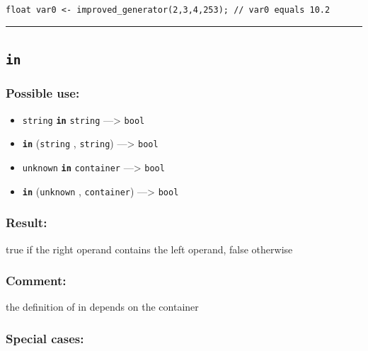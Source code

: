 \documentclass[]{book}
\providecommand{\tightlist}{%
  \setlength{\itemsep}{0pt}\setlength{\parskip}{0pt}}
\theoremstyle{definition}
\theoremstyle{definition}
\theoremstyle{definition}
\theoremstyle{remark}
\begin{document}
\begin{verbatim}
 
float var0 <- improved_generator(2,3,4,253); // var0 equals 10.2
\end{verbatim}

\begin{center}\rule{0.5\linewidth}{\linethickness}\end{center}

\subsection{\texorpdfstring{\texttt{in}}{in}}\label{in}

\subsubsection{Possible use:}\label{possible-use-266}

\begin{itemize}
\tightlist
\item
  \texttt{string} \textbf{\texttt{in}} \texttt{string} ---\textgreater{}
  \texttt{bool}
\item
  \textbf{\texttt{in}} (\texttt{string} , \texttt{string})
  ---\textgreater{} \texttt{bool}
\item
  \texttt{unknown} \textbf{\texttt{in}} \texttt{container}
  ---\textgreater{} \texttt{bool}
\item
  \textbf{\texttt{in}} (\texttt{unknown} , \texttt{container})
  ---\textgreater{} \texttt{bool}
\end{itemize}

\subsubsection{Result:}\label{result-256}

true if the right operand contains the left operand, false otherwise

\subsubsection{Comment:}\label{comment-51}

the definition of in depends on the container

\subsubsection{Special cases:}\label{special-cases-77}
\end{document}
